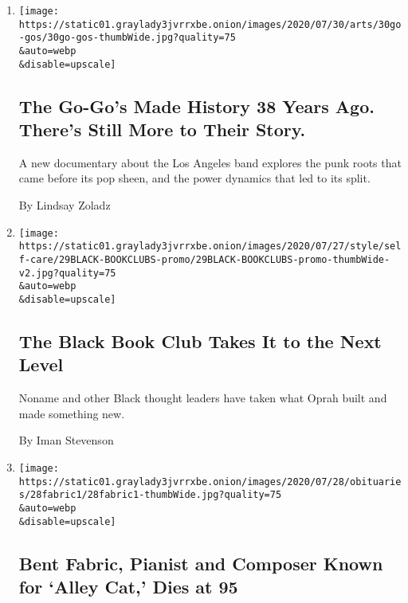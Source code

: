 \begin{enumerate}
\def\labelenumi{\arabic{enumi}.}
\item
  \href{/2020/07/29/arts/music/the-go-gos-documentary.html}{}

  \texttt{[image: https://static01.graylady3jvrrxbe.onion/images/2020/07/30/arts/30go-gos/30go-gos-thumbWide.jpg?quality=75\\\&auto=webp\\\&disable=upscale]}

  \hypertarget{the-go-gos-made-history-38-years-ago-theres-still-more-to-their-story-1}{%
  \subsection{The Go-Go's Made History 38 Years Ago. There's Still More
  to Their
  Story.}\label{the-go-gos-made-history-38-years-ago-theres-still-more-to-their-story-1}}

  A new documentary about the Los Angeles band explores the punk roots
  that came before its pop sheen, and the power dynamics that led to its
  split.

  By Lindsay Zoladz
\item
  \href{/2020/07/29/style/self-care/black-book-clubs.html}{}

  \texttt{[image: https://static01.graylady3jvrrxbe.onion/images/2020/07/27/style/self-care/29BLACK-BOOKCLUBS-promo/29BLACK-BOOKCLUBS-promo-thumbWide-v2.jpg?quality=75\\\&auto=webp\\\&disable=upscale]}

  \hypertarget{the-black-book-club-takes-it-to-the-next-level}{%
  \subsection{The Black Book Club Takes It to the Next
  Level}\label{the-black-book-club-takes-it-to-the-next-level}}

  Noname and other Black thought leaders have taken what Oprah built and
  made something new.

  By Iman Stevenson
\item
  \href{/2020/07/29/arts/music/bent-fabric-dead.html}{}

  \texttt{[image: https://static01.graylady3jvrrxbe.onion/images/2020/07/28/obituaries/28fabric1/28fabric1-thumbWide.jpg?quality=75\\\&auto=webp\\\&disable=upscale]}

  \hypertarget{bent-fabric-pianist-and-composer-known-for-alley-cat-dies-at-95}{%
  \subsection{Bent Fabric, Pianist and Composer Known for `Alley Cat,'
  Dies at
  95}\label{bent-fabric-pianist-and-composer-known-for-alley-cat-dies-at-95}}


\end{enumerate}
